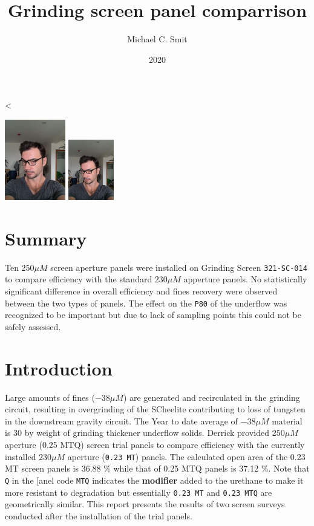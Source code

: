 \documentclass[
]{article}
\title{Grinding screen panel comparrison}
\author{Michael C. Smit}
\date{2020}
\begin{document}
\maketitle

\textless{}

\includegraphics[width=1.04167in,height=\textheight]{images/me-glasses.jpg}
\includegraphics[width=0.78125in,height=\textheight]{images/me-glasses.jpg}

\hypertarget{summary}{%
\section{Summary}\label{summary}}

Ten \(250 \mu M\) screen aperture panels were installed on Grinding
Screen \texttt{321-SC-014} to compare efficiency with the standard
\(230 \mu M\) apperture panels. No statistically significant difference
in overall efficiency and fines recovery were observed between the two
types of panels. The effect on the \texttt{P80} of the underflow was
recognized to be important but due to lack of sampling points this could
not be safely assessed.

\hypertarget{introduction}{%
\section{Introduction}\label{introduction}}

Large amounts of fines (\(-38 \mu M\)) are generated and recirculated in
the grinding circuit, resulting in overgrinding of the SCheelite
contributing to loss of tungsten in the downstream gravity circuit. The
Year to date average of \(-38 \mu M\) material is \(30 %
\) by weight of grinding thickener underflow solids. Derrick provided
\(250 \mu M\) aperture (0.25 MTQ) screen trial panels to compare
efficiency with the currently installed \(230 \mu M\) aperture
(\texttt{0.23\ MT}) panels. The calculated open area of the 0.23 MT
screen panels is 36.88 \% while that of 0.25 MTQ panels is 37.12 \%.
Note that \texttt{Q} in the {[}anel code \texttt{MTQ} indicates the
\textbf{modifier} added to the urethane to make it more resistant to
degradation but essentially \texttt{0.23\ MT} and \texttt{0.23\ MTQ} are
geometrically similar. This report presents the results of two screen
surveys conducted after the installation of the trial panels.
\end{document}
